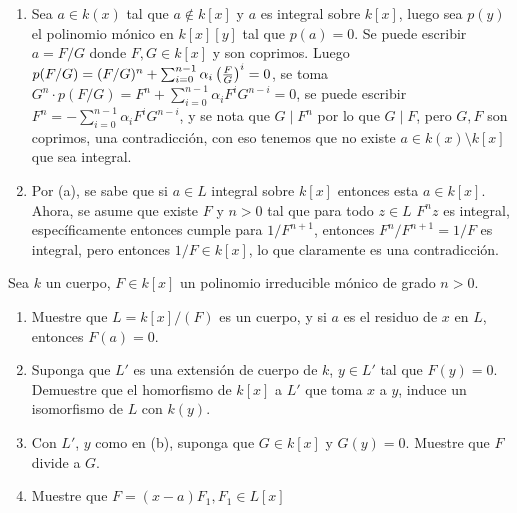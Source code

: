 \begin{sol}{1.49}
    \begin{enumerate}
        \item Sea \(a\in k(x)\) tal que \(a\notin k[x]\) y \(a\) es integral sobre \(k[x]\), luego sea \(p(y)\) el polinomio mónico en \(k[x][y]\) tal que \(p(a)=0\). Se puede escribir \(a=F/G\) donde \(F,G\in k[x]\) y son coprimos. Luego \(p(F/G)=(F/G)^n+\sum_{i=0}^{n-1}\alpha_i\left(\frac{F}{G}\right)^i=0\), se toma \(G^n\cdot p(F/G)=F^n+\sum_{i=0}^{n-1}\alpha_i F^iG^{n-i}=0\), se puede escribir \(F^n=-\sum_{i=0}^{n-1}\alpha_i F^iG^{n-i}\), y se nota que \(G\mid F^n\) por lo que \(G\mid F\), pero \(G,F\) son coprimos, una contradicción, con eso tenemos que no existe \(a\in k(x)\setminus k[x]\) que sea integral.
        \item Por (a), se sabe que si \(a\in L\) integral sobre \(k[x]\) entonces esta \(a\in k[x]\). Ahora, se asume que existe \(F\) y \(n>0\) tal que para todo \(z\in L\) \(F^nz\) es integral, específicamente entonces cumple para \(1/F^{n+1}\), entonces \(F^n/F^{n+1}=1/F\) es integral, pero entonces \(1/F\in k[x]\), lo que claramente es una contradicción.
    \end{enumerate}
\end{sol}

\begin{prob}{1.51}
    Sea \(k\) un cuerpo, \(F\in k[x]\) un polinomio irreducible mónico de grado \(n>0\).
    \begin{enumerate}
        \item Muestre que \(L=k[x]/(F)\) es un cuerpo, y si \(a\) es el residuo de \(x\) en \(L\), entonces \(F(a)=0\).
        \item Suponga que \(L'\) es una extensión de cuerpo de \(k\), \(y\in L'\) tal que \(F(y)=0\). Demuestre que el homorfismo de \(k[x]\) a \(L'\) que toma \(x\) a \(y\), induce un isomorfismo de \(L\) con \(k(y)\).
        \item Con \(L'\), \(y\) como en (b), suponga que \(G\in k[x]\) y \(G(y)=0\). Muestre que \(F\) divide a \(G\).
        \item Muestre que \(F=(x-a)F_1,F_1\in L[x]\)
    \end{enumerate}
\end{prob}

